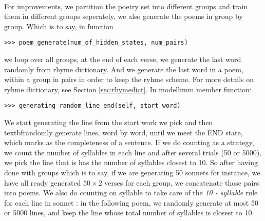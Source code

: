 \paragraph{}
For improvements, we partition the poetry set into different groups and train them in different groups seperately, we also generate the poems in group by group. Which is to say, in function
\begin{lstlisting}
>>> poem_generate(num_of_hidden_states, num_pairs)
\end{lstlisting}
we loop over all groups, at the end of each verse, we generate the last word randomly from rhyme dictionary. And we generate the last word in a poem, within a group in pairs in order to keep the ryhme scheme. For more details on ryhme dictionary, see Section \ref{sec:rhymedict}. In modelhmm member function:
\begin{lstlisting}
>>> generating_random_line_end(self, start_word)
\end{lstlisting}
We start generating the line from the start work we pick and then \\textbf{randomly} generate lines, word by word, until we meet the END state, which marks as the completeness of a sentence. If we do counting as a strategy, we count the number of syllables in each line and after several trials (50 or 5000), we pick the line that is has the number of syllables closest to 10. So after having done with groups which is to say, if we are generating 50 sonnets for instance, we have all ready generated $50 \times 2$ verses for each group, we concatenate those pairs into poems. We also do counting on syllable to take care of the \textit{10 - syllable} rule for
each line in sonnet : in the following poem, we randomly generate at most 50 or 5000 lines, and keep the line whose total number of syllables is closest to 10.

